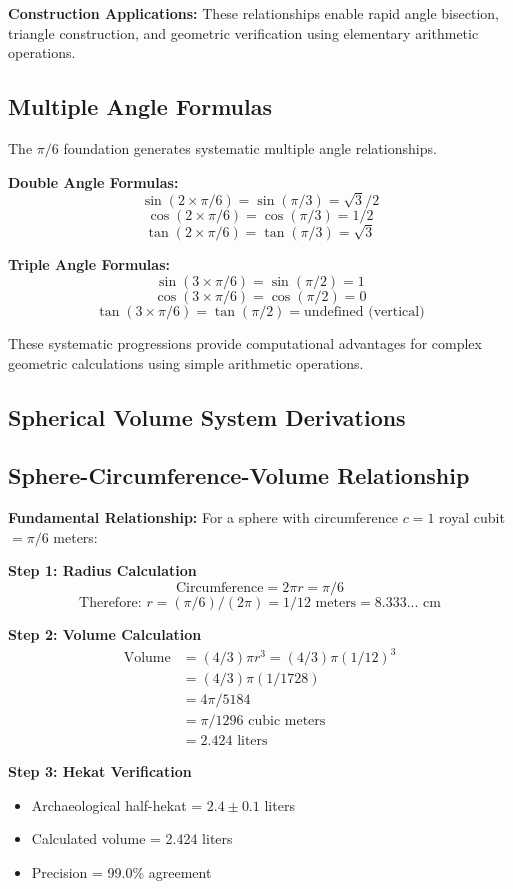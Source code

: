 \documentclass[11pt]{article}
\begin{document}
\textbf{Construction Applications:} These relationships enable rapid angle bisection, triangle construction, and geometric verification using elementary arithmetic operations.

\subsection{Multiple Angle Formulas}
The $\pi/6$ foundation generates systematic multiple angle relationships.

\textbf{Double Angle Formulas:}
\[ \sin(2 \times \pi/6) = \sin(\pi/3) = \sqrt{3}/2 \]
\[ \cos(2 \times \pi/6) = \cos(\pi/3) = 1/2 \]
\[ \tan(2 \times \pi/6) = \tan(\pi/3) = \sqrt{3} \]

\textbf{Triple Angle Formulas:}
\[ \sin(3 \times \pi/6) = \sin(\pi/2) = 1 \]
\[ \cos(3 \times \pi/6) = \cos(\pi/2) = 0 \]
\[ \tan(3 \times \pi/6) = \tan(\pi/2) = \text{undefined (vertical)} \]

These systematic progressions provide computational advantages for complex geometric calculations using simple arithmetic operations.

\subsection{Spherical Volume System Derivations}

\subsection{Sphere-Circumference-Volume Relationship}
\textbf{Fundamental Relationship:} For a sphere with circumference $c = 1$ royal cubit $= \pi/6$ meters:

\textbf{Step 1: Radius Calculation}
\[ \text{Circumference} = 2\pi r = \pi/6 \]
\[ \text{Therefore: } r = (\pi/6)/(2\pi) = 1/12 \text{ meters} = 8.333... \text{ cm} \]

\textbf{Step 2: Volume Calculation}
\begin{align*}
\text{Volume} &= (4/3)\pi r^3 = (4/3)\pi(1/12)^3 \\
             &= (4/3)\pi(1/1728) \\
             &= 4\pi/5184 \\
             &= \pi/1296 \text{ cubic meters} \\
             &= 2.424 \text{ liters}
\end{align*}

\textbf{Step 3: Hekat Verification}
\begin{itemize}
    \item Archaeological half-hekat = $2.4 \pm 0.1$ liters
    \item Calculated volume = 2.424 liters
    \item Precision = 99.0\% agreement
\end{itemize}
\end{document}
